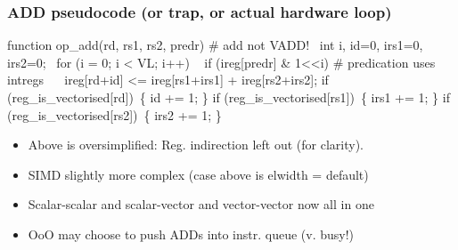 \documentclass[slidestop]{beamer}
\begin{document}


\begin{frame}[fragile]
\frametitle{ADD pseudocode (or trap, or actual hardware loop)}

\begin{semiverbatim}
function op\_add(rd, rs1, rs2, predr) # add not VADD!
  int i, id=0, irs1=0, irs2=0;
  for (i = 0; i < VL; i++)
    if (ireg[predr] & 1<<i) # predication uses intregs
       ireg[rd+id] <= ireg[rs1+irs1] + ireg[rs2+irs2];
    if (reg\_is\_vectorised[rd]) \{ id += 1; \}
    if (reg\_is\_vectorised[rs1]) \{ irs1 += 1; \}
    if (reg\_is\_vectorised[rs2]) \{ irs2 += 1; \}
\end{semiverbatim}

  \begin{itemize}
   \item Above is oversimplified: Reg. indirection left out (for clarity).
   \item SIMD slightly more complex (case above is elwidth = default)
   \item Scalar-scalar and scalar-vector and vector-vector now all in one
   \item OoO may choose to push ADDs into instr. queue (v. busy!)
  \end{itemize}
\end{frame}
\end{document}
